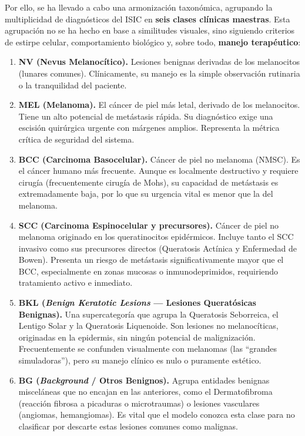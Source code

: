 Por ello, se ha llevado a cabo una armonización taxonómica, agrupando la multiplicidad de diagnósticos del ISIC en \textbf{seis clases clínicas maestras}. Esta agrupación no se ha hecho en base a similitudes visuales, sino siguiendo criterios de estirpe celular, comportamiento biológico y, sobre todo, \textbf{manejo terapéutico}:

\begin{enumerate}
	\item \textbf{NV (Nevus Melanocítico).} Lesiones benignas derivadas de los melanocitos (lunares comunes). Clínicamente, su manejo es la simple observación rutinaria o la tranquilidad del paciente.
	
	\item \textbf{MEL (Melanoma).} El cáncer de piel más letal, derivado de los melanocitos. Tiene un alto potencial de metástasis rápida. Su diagnóstico exige una escisión quirúrgica urgente con márgenes amplios. Representa la métrica crítica de seguridad del sistema.
	
	\item \textbf{BCC (Carcinoma Basocelular).} Cáncer de piel no melanoma (NMSC). Es el cáncer humano más frecuente. Aunque es localmente destructivo y requiere cirugía (frecuentemente cirugía de Mohs), su capacidad de metástasis es extremadamente baja, por lo que su urgencia vital es menor que la del melanoma.
	
	\item \textbf{SCC (Carcinoma Espinocelular y precursores).} Cáncer de piel no melanoma originado en los queratinocitos epidérmicos. Incluye tanto el SCC invasivo como sus precursores directos (Queratosis Actínica y Enfermedad de Bowen). Presenta un riesgo de metástasis significativamente mayor que el BCC, especialmente en zonas mucosas o inmunodeprimidos, requiriendo tratamiento activo e inmediato.
	
	\item \textbf{BKL (\textit{Benign Keratotic Lesions} --- Lesiones Queratósicas Benignas).} Una supercategoría que agrupa la Queratosis Seborreica, el Lentigo Solar y la Queratosis Liquenoide. Son lesiones no melanocíticas, originadas en la epidermis, sin ningún potencial de malignización. Frecuentemente se confunden visualmente con melanomas (las ``grandes simuladoras''), pero su manejo clínico es nulo o puramente estético.
	
	\item \textbf{BG (\textit{Background} / Otros Benignos).} Agrupa entidades benignas misceláneas que no encajan en las anteriores, como el Dermatofibroma (reacción fibrosa a picaduras o microtraumas) o lesiones vasculares (angiomas, hemangiomas). Es vital que el modelo conozca esta clase para no clasificar por descarte estas lesiones comunes como malignas.
\end{enumerate}

